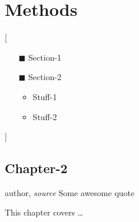 \part{Methods}[
\vspace{1cm}
\begin{center}
\begin{minipage}{.5\textwidth}
\small{
\begin{enumerate}
\item[$\blacksquare$] Section-1
\item[$\blacksquare$] Section-2
\begin{itemize}
\item Stuff-1
\item Stuff-2
\end{itemize}
\end{enumerate}
}
\end{minipage}
\end{center}

]
\clearpage
\chapter{Chapter-2}
\label{chap:chap2}

\begin{chapquote}{author, \textit{source}}
Some awesome quote
\end{chapquote}



\mbox{}
\vfill

This chapter covers \dots

\clearpage

\lipsum


\afterpage{\blankpage}